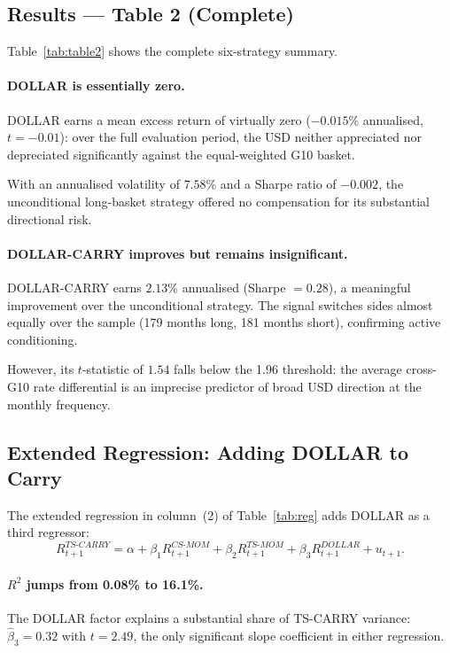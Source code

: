 \documentclass[a4paper,12pt]{article}
\begin{document}
\subsection{Results --- Table 2 (Complete)}

Table~\ref{tab:table2} shows the complete six-strategy summary.

\paragraph{DOLLAR is essentially zero.}
DOLLAR earns a mean excess return of virtually zero ($-0.015\%$ annualised, $t = -0.01$):
over the full evaluation period, the USD neither appreciated nor depreciated significantly
against the equal-weighted G10 basket.

With an annualised volatility of $7.58\%$ and a Sharpe ratio of $-0.002$, the unconditional
long-basket strategy offered no compensation for its substantial directional risk.

\paragraph{DOLLAR-CARRY improves but remains insignificant.}
DOLLAR-CARRY earns $2.13\%$ annualised (Sharpe $= 0.28$), a meaningful improvement over the
unconditional strategy. The signal switches sides almost equally over the sample (179 months
long, 181 months short), confirming active conditioning.

However, its $t$-statistic of $1.54$ falls below the 1.96 threshold: the average cross-G10
rate differential is an imprecise predictor of broad USD direction at the monthly frequency.

\subsection{Extended Regression: Adding DOLLAR to Carry}

The extended regression in column~(2) of Table~\ref{tab:reg} adds DOLLAR as a third
regressor:
\begin{equation}
    R^{TS\text{-}CARRY}_{t+1} = \alpha + \beta_1 R^{CS\text{-}MOM}_{t+1}
        + \beta_2 R^{TS\text{-}MOM}_{t+1} + \beta_3 R^{DOLLAR}_{t+1} + u_{t+1}.
\end{equation}

\paragraph{$R^2$ jumps from 0.08\% to 16.1\%.}
The DOLLAR factor explains a substantial share of TS-CARRY variance: $\hat{\beta}_3 = 0.32$
with $t = 2.49$, the only significant slope coefficient in either regression.
\end{document}
